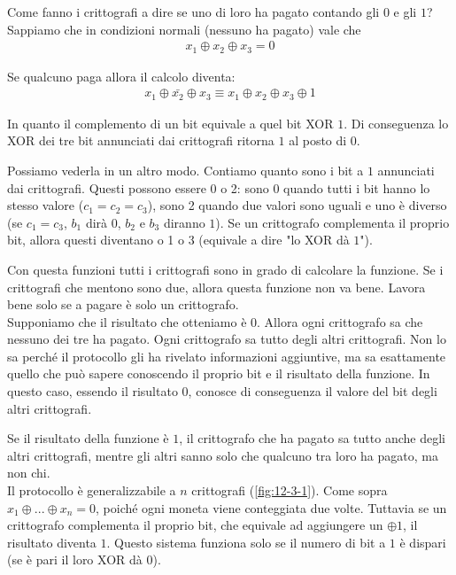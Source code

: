 \noindent Come fanno i crittografi a dire se uno di loro ha pagato contando gli $0$ e gli $1$? Sappiamo che in condizioni normali (nessuno ha pagato) vale che
\begin{align*}
    x_1 \oplus x_2 \oplus x_3 = 0
\end{align*}

\noindent Se qualcuno paga allora il calcolo diventa:
\begin{align*}
    x_1 \oplus \bar{x_2} \oplus x_3 \equiv x_1 \oplus x_2 \oplus x_3 \oplus 1
\end{align*}

\noindent In quanto il complemento di un bit equivale a quel bit XOR $1$. Di conseguenza lo XOR dei tre bit annunciati dai crittografi ritorna $1$ al posto di $0$. 

Possiamo vederla in un altro modo. Contiamo quanto sono i bit a $1$ annunciati dai crittografi. Questi possono essere 0 o 2: sono 0 quando tutti i bit hanno lo stesso valore ($c_1 = c_2 = c_3$), sono 2 quando due valori sono uguali e uno è diverso (se $c_1 = c_3$, $b_1$ dirà $0$, $b_2$ e $b_3$ diranno $1$). Se un crittografo complementa il proprio bit, allora questi diventano o 1 o 3 (equivale a dire "lo XOR dà $1$"). 

Con questa funzioni tutti i crittografi sono in grado di calcolare la funzione. Se i crittografi che mentono sono due, allora questa funzione non va bene. Lavora bene solo se a pagare è solo un crittografo.
\\

\noindent Supponiamo che il risultato che otteniamo è $0$. Allora ogni crittografo sa che nessuno dei tre ha pagato. Ogni crittografo sa tutto degli altri crittografi. Non lo sa perché il protocollo gli ha rivelato informazioni aggiuntive, ma sa esattamente quello che può sapere conoscendo il proprio bit e il risultato della funzione. In questo caso, essendo il risultato $0$, conosce di conseguenza il valore del bit degli altri crittografi. 

Se il risultato della funzione è $1$, il crittografo che ha pagato sa tutto anche degli altri crittografi, mentre gli altri sanno solo che qualcuno tra loro ha pagato, ma non chi.
\\

\noindent Il protocollo è generalizzabile a $n$ crittografi (\ref{fig:12-3-1}). Come sopra $x_1 \oplus ... \oplus x_n = 0$, poiché ogni moneta viene conteggiata due volte. Tuttavia se un crittografo complementa il proprio bit, che equivale ad aggiungere un $\oplus 1$, il risultato diventa $1$. Questo sistema funziona solo se il numero di bit a $1$ è dispari (se è pari il loro XOR dà $0$).

